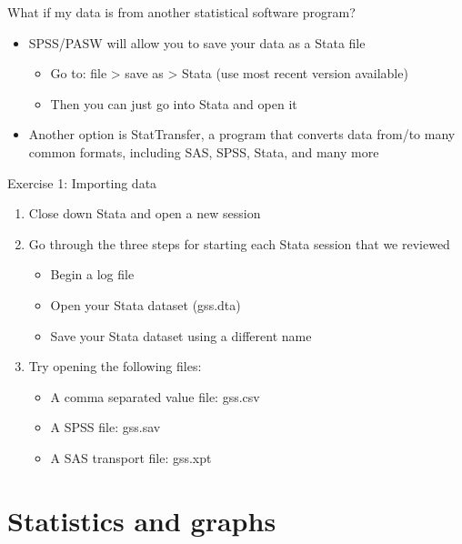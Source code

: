\documentclass[table,smaller]{beamer}
\begin{document}
\begin{frame}[label=sec-2-5]{What if my data is from another statistical software program?}
\begin{itemize}
\item SPSS/PASW will allow you to save your data as a Stata file
\begin{itemize}
\item Go to: file > save as > Stata (use most   recent version available)
\item Then you can just go into Stata and   open it
\end{itemize}
\item Another option is \alert{StatTransfer}, a program that converts data from/to many common formats, including SAS, SPSS, Stata, and many more
\end{itemize}
\end{frame}

\begin{frame}[label=sec-2-6]{Exercise 1: Importing data}
\begin{enumerate}
\item Close down Stata and open a new session
\item Go through the three steps for starting each Stata  session that we reviewed
\begin{itemize}
\item Begin a log file
\item Open your Stata dataset (gss.dta)
\item Save your Stata dataset using a different name
\end{itemize}
\item Try opening the following files:
\begin{itemize}
\item A comma separated value file: gss.csv
\item A SPSS file: gss.sav
\item A SAS transport file: gss.xpt
\end{itemize}
\end{enumerate}
\end{frame}


\section{Statistics and graphs}
\label{sec-3}
\end{document}

